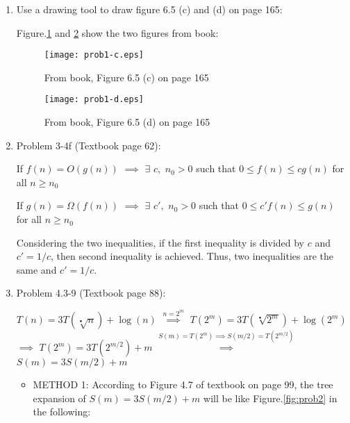 \documentclass[11pt]{article}
\begin{document}
\begin{enumerate}

\itemsep 0.35in


\item Use a drawing tool to draw figure 6.5 (c) and (d) on page 165: 

	Figure.\ref{fig:prob1-c} and \ref{fig:prob1-d} show the two figures from book:

	\begin{figure}[h!]
		\centerline{\texttt{[image: prob1-c.eps]}}
		\caption{From book, Figure 6.5 (c) on page 165}
		\label{fig:prob1-c}
	\end{figure}
	
	\begin{figure}[h!]
		\centerline{\texttt{[image: prob1-d.eps]}}
		\caption{From book, Figure 6.5 (d) on page 165}
		\label{fig:prob1-d}
	\end{figure}





\item Problem 3-4f (Textbook page 62):

	If $ f(n)= O(g(n)) $ $\implies$ $ \exists $ $ c, $ $ n_0>0 $ such that $ 0 \leq f(n) \leq cg(n) $ for all $ n \geq n_0 $  
	
	If $ g(n)= \Omega(f(n)) $ $\implies$ $ \exists $ $ c{'}, $ $ n_0>0 $ such that $ 0 \leq c{'}f(n) \leq g(n) $ for all $ n \geq n_0 $     
	
	Considering the two inequalities, if the first inequality is divided by $c$ and $c{'} = 1/c$, then second inequality is achieved. Thus, two inequalities are the same and $c{'} = 1/c$.  





\pagebreak

\item Problem 4.3-9 (Textbook page 88):
	
	$ T(n) = 3T(\sqrt[•]{n}) + \log(n) $ 
	$ \overset{n=2^m}{\implies} $ 
	$ T(2^m) = 3T(\sqrt[•]{2^m}) + \log(2^m) $ 
	$ \implies $ 
	$T(2^m) = 3T(2^{m/2}) + m $ 
	$ \overset{S(m)=T(2^m) \implies S(m/2)=T(2^{m/2})}{\implies} $ 
	$ S(m) = 3S(m/2) + m$ 
	
	
	\begin{itemize}
    	\item METHOD 1:
     	According to Figure 4.7 of textbook on page 99, the tree expansion of $ S(m) = 3S(m/2) + m$ will be like Figure.\ref{fig:prob2} in the following:
     	

\end{itemize}
\end{enumerate}
\end{document}
